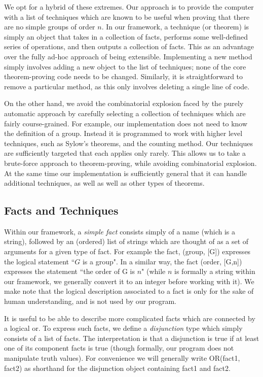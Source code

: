 \documentclass[11pt, oneside]{article}   	%
\begin{document}
We opt for a hybrid of these extremes.  Our approach is to provide the computer with a list of techniques which are known to be useful when proving that there are no simple groups of order $n$.  In our framework, a technique (or theorem) is simply an object that takes in a collection of facts, performs some well-defined series of operations, and then outputs a collection of facts.  This as an advantage over the fully ad-hoc approach of being extensible. Implementing a new method simply involves adding a new object to the list of techniques; none of the core theorem-proving code needs to be changed.  Similarly, it is straightforward to remove a particular method, as this only involves deleting a single line of code.

On the other hand, we avoid the combinatorial explosion faced by the purely automatic approach by carefully selecting a collection of techniques which are fairly course-grained.  For example, our implementation does not need to know the definition of a group.  Instead it is programmed to work with higher level techniques, such as Sylow's theorems, and the counting method.  Our techniques are sufficiently targeted that each applies only rarely.  This allows us to take a brute-force approach to theorem-proving, while avoiding combinatorial explosion.  At the same time our implementation is sufficiently general that it can handle additional techniques, as well as well as other types of theorems.

\subsection{Facts and Techniques}

Within our framework, a \textit{simple fact} consists simply of a name (which is a string), followed by an (ordered) list of strings which are thought of as a set of arguments for a given type of fact.  For example the fact, (group, [G]) expresses the logical statement ``$G$ is a group". In a similar way, the fact (order, [G,n]) expresses the statement ``the order of G is $n$"  (while $n$ is formally a string within our framework, we generally convert it to an integer before working with it).  We make note that the logical description associated to a fact is only for the sake of human understanding, and is not used by our program.

It is useful to be able to describe more complicated facts which are connected by a logical or.  To express such facts, we define a \textit{disjunction} type which simply consists of a list of facts.  The interpretation is that a disjunction is true if at least one of its component facts is true (though formally, our program does not manipulate truth values).  For convenience we will generally write OR(fact1, fact2) as shorthand for the disjunction object containing fact1 and fact2.
\end{document}
